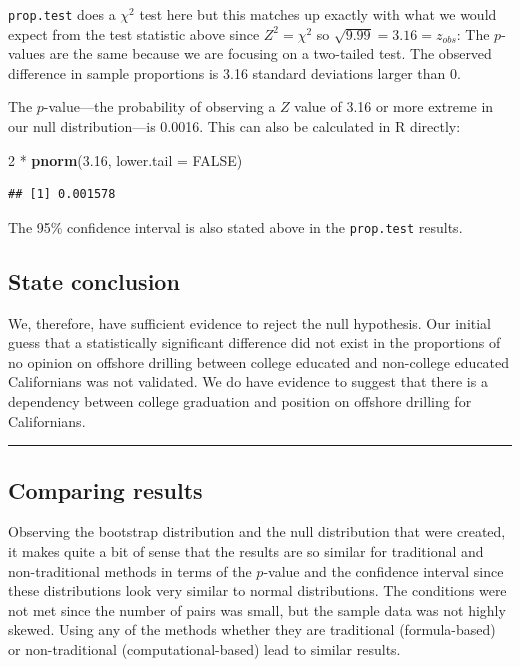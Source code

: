 \documentclass[]{tufte-book}
\newenvironment{Shaded}{\begin{snugshade}}{\end{snugshade}}
\newcommand{\KeywordTok}[1]{\textcolor[rgb]{0.13,0.29,0.53}{\textbf{{#1}}}}
\newcommand{\DataTypeTok}[1]{\textcolor[rgb]{0.13,0.29,0.53}{{#1}}}
\newcommand{\DecValTok}[1]{\textcolor[rgb]{0.00,0.00,0.81}{{#1}}}
\newcommand{\FloatTok}[1]{\textcolor[rgb]{0.00,0.00,0.81}{{#1}}}
\newcommand{\StringTok}[1]{\textcolor[rgb]{0.31,0.60,0.02}{{#1}}}
\newcommand{\OtherTok}[1]{\textcolor[rgb]{0.56,0.35,0.01}{{#1}}}
\newcommand{\NormalTok}[1]{{#1}}
\let\oldrule=\rule
\renewcommand{\rule}[1]{\oldrule{\linewidth}}
\theoremstyle{definition}
\theoremstyle{definition}
\theoremstyle{remark}
\begin{document}
\texttt{prop.test} does a \(\chi^2\) test here but this matches up
exactly with what we would expect from the test statistic above since
\(Z^2 = \chi^2\) so \(\sqrt{9.99} = 3.16 = z_{obs}\): The \(p\)-values
are the same because we are focusing on a two-tailed test. The observed
difference in sample proportions is 3.16 standard deviations larger than
0.

The \(p\)-value---the probability of observing a \(Z\) value of 3.16 or
more extreme in our null distribution---is 0.0016. This can also be
calculated in R directly:

\begin{Shaded}
\begin{Highlighting}[]
\DecValTok{2} \NormalTok{*}\StringTok{ }\KeywordTok{pnorm}\NormalTok{(}\FloatTok{3.16}\NormalTok{, }\DataTypeTok{lower.tail =} \OtherTok{FALSE}\NormalTok{)}
\end{Highlighting}
\end{Shaded}

\begin{verbatim}
## [1] 0.001578
\end{verbatim}

The 95\% confidence interval is also stated above in the
\texttt{prop.test} results.

\subsection{State conclusion}\label{state-conclusion-2}

We, therefore, have sufficient evidence to reject the null hypothesis.
Our initial guess that a statistically significant difference did not
exist in the proportions of no opinion on offshore drilling between
college educated and non-college educated Californians was not
validated. We do have evidence to suggest that there is a dependency
between college graduation and position on offshore drilling for
Californians.

\begin{center}\rule{0.5\linewidth}{\linethickness}\end{center}

\subsection{Comparing results}\label{comparing-results-2}

Observing the bootstrap distribution and the null distribution that were
created, it makes quite a bit of sense that the results are so similar
for traditional and non-traditional methods in terms of the \(p\)-value
and the confidence interval since these distributions look very similar
to normal distributions. The conditions were not met since the number of
pairs was small, but the sample data was not highly skewed. Using any of
the methods whether they are traditional (formula-based) or
non-traditional (computational-based) lead to similar results.
\end{document}

